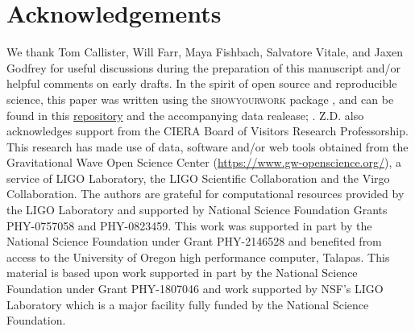 \documentclass[twocolumn]{aastex631}
\begin{document}






\section{Acknowledgements}\label{sec:acknowledments}
We thank Tom Callister, Will Farr, Maya Fishbach, Salvatore Vitale, and Jaxen Godfrey for useful discussions during the 
preparation of this manuscript and/or helpful comments on early drafts. In the spirit of open source and 
reproducible science, this paper was written using the \textsc{showyourwork} package \citep{Luger2021}, and can be 
found in this \href{https://github.com/bruce-edelman/CoveringYourBasis}{repository} and the accompanying data realease; \citet{edelman_bruce_2022_7422514}. Z.D. also acknowledges support from 
the CIERA Board of Visitors Research Professorship.  This research has made use of data, software and/or web tools obtained 
from the Gravitational Wave Open Science Center (\url{https://www.gw-openscience.org/}), a service of LIGO Laboratory, the 
LIGO Scientific Collaboration and the Virgo Collaboration. The authors are grateful for computational resources 
provided by the LIGO Laboratory and supported by National Science Foundation Grants PHY-0757058 and PHY-0823459.  
This work was supported in part by the National Science Foundation under Grant PHY-2146528 and benefited from access 
to the University of Oregon high performance computer, Talapas. This material is based upon work supported in part 
by the National Science Foundation under Grant PHY-1807046 and work supported by NSF's LIGO Laboratory which is a major 
facility fully funded by the National Science Foundation.


{}



\end{document}
